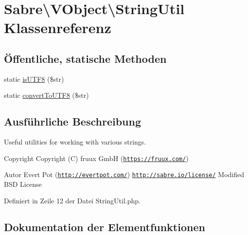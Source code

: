 \hypertarget{class_sabre_1_1_v_object_1_1_string_util}{}\section{Sabre\textbackslash{}V\+Object\textbackslash{}String\+Util Klassenreferenz}
\label{class_sabre_1_1_v_object_1_1_string_util}
\subsection*{Öffentliche, statische Methoden}
\begin{DoxyCompactItemize}
\item 
static \mbox{\hyperlink{class_sabre_1_1_v_object_1_1_string_util_af127bdab773428f41f2b93102ad562a2}{is\+U\+T\+F8}} (\$str)
\item 
static \mbox{\hyperlink{class_sabre_1_1_v_object_1_1_string_util_a6144b20f5fb77edf84799e52c3662554}{convert\+To\+U\+T\+F8}} (\$str)
\end{DoxyCompactItemize}


\subsection{Ausführliche Beschreibung}
Useful utilities for working with various strings.

\begin{DoxyCopyright}{Copyright}
Copyright (C) fruux GmbH (\href{https://fruux.com/}{\tt https\+://fruux.\+com/}) 
\end{DoxyCopyright}
\begin{DoxyAuthor}{Autor}
Evert Pot (\href{http://evertpot.com/}{\tt http\+://evertpot.\+com/})  \href{http://sabre.io/license/}{\tt http\+://sabre.\+io/license/} Modified B\+SD License 
\end{DoxyAuthor}


Definiert in Zeile 12 der Datei String\+Util.\+php.



\subsection{Dokumentation der Elementfunktionen}
\mbox{\label{class_sabre_1_1_v_object_1_1_string_util_a6144b20f5fb77edf84799e52c3662554}} 
